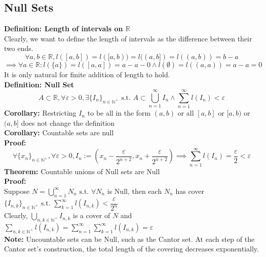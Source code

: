 \documentclass{article}
\newcommand{\R}{\mathbb{R}}
\newcommand{\N}{\mathbb{N}}
\newcommand{\st}{\mbox{ s.t. }}
\newcommand{\0}{{\bf{0}}}
\newcommand{\1}{{\bf{1}}}
\begin{document}
\subsection{Null Sets}
\textbf{Definition: Length of intervals on $\R$}\\
Clearly, we want to define the length of intervals as the difference between their two ends.
$$\forall a,b\in\R,l([a,b])=l([a,b))=l((a,b])=l((a,b))=b-a$$
$$\implies\forall a\in\R:l(\{a\})=l([a,a])=a-a-0\land l(\emptyset)=l((a,a))=a-a=0$$
It is only natural for finite addition of length to hold.\\
\textbf{Definition: Null Set}
$$A\subset\R,\forall\varepsilon>0,\exists\{I_n\}_{n\in\N^+}\st A\subset\bigcup_{n=1}^\infty I_n\land\sum_{n=1}^\infty l(I_n)<\varepsilon$$
\textbf{Corollary:} Restricting $I_n$ to be all in the form $(a,b)$ or all $[a,b]$ or $[a,b)$ or $(a,b]$ does not change the definition\\
\textbf{Corollary:} Countable sets are null\\
\textbf{Proof:}
$$\forall\{x_n\}_{n\in\N^+},\forall\varepsilon>0,I_n:=\left(x_n-\frac{\varepsilon}{2^{n+2}},x_n+\frac{\varepsilon}{2^{n+2}}\right)\implies\sum_{n=1}^\infty l(I_n)=\frac{\varepsilon}{2}<\varepsilon$$
\textbf{Theorem:} Countable unions of Null sets are Null\\
\textbf{Proof:}\\
Suppose $N=\bigcup\limits_{n=1}^\infty N_n\st\forall N_n$ is Null, then each $N_n$ has cover $\{I_{n,k}\}_{n\in\N^+}\st\sum\limits_{k=1}^\infty l(I_{n,k})<\dfrac{\varepsilon}{2^n}$\\
Clearly, $\bigcup\limits_{n,k\in\N^+}I_{n,k}$ is a cover of $N$ and $\sum\limits_{n,k\in\N^+}l(I_{n,k})=\sum\limits_{n=1}^\infty\sum\limits_{k=1}^\infty l(I_{n,k})=\varepsilon$\\
\textbf{Note:} Uncountable sets can be Null, such as the Cantor set. At each step of the Cantor set's construction, the total length of the covering decreases exponentially. 
\end{document}
